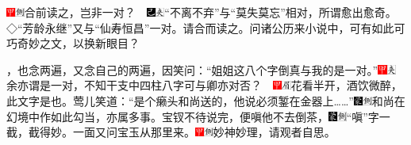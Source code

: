 %
%
%
%
%

{{\includegraphics[width=3mm]{../Images/00002}\includegraphics[width=3mm]{../Images/00011}\footnotesize \kaishu 合前读之，岂非一对？　}\includegraphics[width=3mm]{../Images/00003}\includegraphics[width=3mm]{../Images/00012}\footnotesize \kaishu ``不离不弃''与``莫失莫忘''相对，所谓愈出愈奇。◇``芳龄永继''又与``仙寿恒昌''一对。请合而读之。问诸公历来小说中，可有如此可巧奇妙之文，以换新眼目？}

，也念两遍，又念自己的两遍，因笑问：``姐姐这八个字倒真与我的是一对。''{\includegraphics[width=3mm]{../Images/00002}\includegraphics[width=3mm]{../Images/00012}\footnotesize \kaishu 余亦谓是一对，不知干支中四柱八字可与卿亦对否？　\includegraphics[width=3mm]{../Images/00002}\includegraphics[width=3mm]{../Images/00010}\footnotesize \kaishu 花看半开，酒饮微醉，此文字是也。}莺儿笑道：``是个癞头和尚送的，他说必须錾在金器上\ldots{}\ldots{}''{\includegraphics[width=3mm]{../Images/00006}\includegraphics[width=3mm]{../Images/00011}\footnotesize \kaishu 和尚在幻境中作如此勾当，亦属多事。}宝钗不待说完，便嗔他不去倒茶，{\includegraphics[width=3mm]{../Images/00006}\includegraphics[width=3mm]{../Images/00011}\footnotesize \kaishu ``嗔''字一截，截得妙。}一面又问宝玉从那里来。{\includegraphics[width=3mm]{../Images/00002}\includegraphics[width=3mm]{../Images/00011}\footnotesize \kaishu 妙神妙理，请观者自思。}


